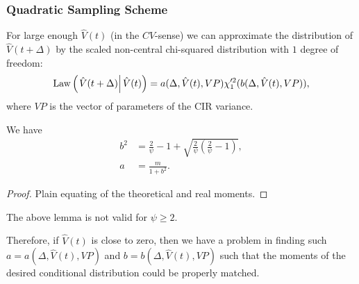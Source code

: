            \subsubsection{Quadratic Sampling Scheme}
                For large enough $\hat{V}(t)$ (in the $CV$-sense) we can approximate the distribution of $\hat{V}(t+\Delta)$ by the scaled non-central chi-squared distribution with $1$ degree of freedom:
                \begin{align}
                    \operatorname*{Law}\left(\left.\hat{V}(t+\Delta) \right| \hat V(t)\right) =  a(\Delta, \hat{V}(t), VP) \chi'^2_1(b(\Delta, \hat{V}(t), VP)),
                \end{align}
                where $VP$ is the vector of parameters of the CIR variance.
                \begin{lemma}
                    We have
                    \begin{align}
                        b^2 &= \frac{2}{\psi} -1 +\sqrt{\frac{2}{\psi}\left(\frac{2}{\psi}-1\right)}, \label{eq:quadratic:a}\\ 
                        a   &= \frac{m}{1+b^2}. \label{eq:quadratic:b}
                    \end{align}
                \end{lemma}
                \begin{proof}
                    {\color{red}Plain equating of the theoretical and real moments.}

                \end{proof}
                \begin{remark}
                    The above lemma is not valid for $\psi \geq 2$.
                \end{remark}
                Therefore, if $\hat{V}(t)$ is close to zero, then we have a problem in finding such $a = a(\Delta, \hat{V}(t), VP)$ and $b = b(\Delta, \hat{V}(t), VP)$ such that the moments of the desired conditional distribution could be properly matched.

